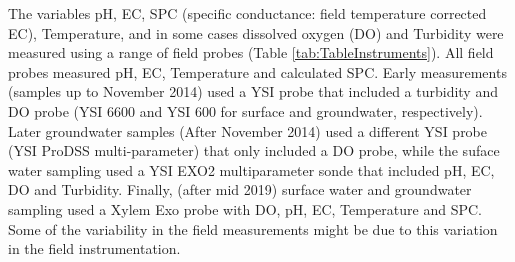 \documentclass[, manuscript]{copernicus}
\begin{document}
The variables pH, EC, SPC (specific conductance: field temperature
corrected EC), Temperature, and in some cases dissolved oxygen (DO) and
Turbidity were measured using a range of field probes (Table
\ref{tab:TableInstruments}). All field probes measured pH, EC,
Temperature and calculated SPC. Early measurements (samples up to
November 2014) used a YSI probe that included a turbidity and DO probe
(YSI 6600 and YSI 600 for surface and groundwater, respectively). Later
groundwater samples (After November 2014) used a different YSI probe
(YSI ProDSS multi-parameter) that only included a DO probe, while the
suface water sampling used a YSI EXO2 multiparameter sonde that included
pH, EC, DO and Turbidity. Finally, (after mid 2019) surface water and
groundwater sampling used a Xylem Exo probe with DO, pH, EC, Temperature
and SPC. Some of the variability in the field measurements might be due
to this variation in the field instrumentation.
\end{document}
